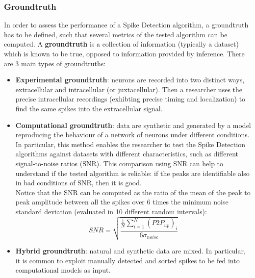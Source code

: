 \subsubsection{Groundtruth}
In order to assess the performance of a Spike Detection algorithm, a groundtruth has to
be defined, such that several metrics of the tested algorithm can be computed.
A \textbf{groundtruth} is a collection of information (typically a dataset)
which is known to be true, opposed to information provided by inference.
There are 3 main types of groundtruths:
\begin{itemize}
    \item \textbf{Experimental groundtruth}: neurons are recorded into two distinct ways,
          extracellular and intracellular (or juxtacellular). Then a researcher uses the
          precise intracellular recordings (exhibting precise timing and localization) to find
          the same spikes into the extracellular signal.
    \item \textbf{Computational groundtruth}: data are synthetic and generated by a model
          reproducing the behaviour of a network of neurons under different conditions.\\
          In particular, this method enables the researcher to test the Spike Detection
          algorithms against datasets with different characteristics, such as different
          signal-to-noise ratios (SNR). This comparison using SNR can help to understand if
          the tested algorithm is reliable: if the peaks are identifiable also in bad
          conditions of SNR, then it is good.\\
          Notice that the SNR can be computed as the ratio of the mean of the peak to peak
          amplitude between all the spikes over 6 times the minimum noise standard deviation
          (evaluated in 10 different random intervals):
          \begin{equation*}
              SNR = \sqrt{\frac{\frac{1}{N}\sum_{i=1}^N(P2P_{up})_i}{6\sigma_{noise}}}
          \end{equation*}
    \item \textbf{Hybrid groundtruth}: natural and synthetic data are mixed.
          In particular, it is common to exploit manually detected and sorted spikes to be
          fed into computational models as input.
\end{itemize}
